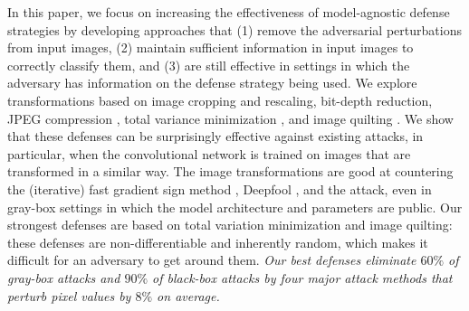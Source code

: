 In this paper, we focus on increasing the effectiveness of model-agnostic defense strategies by developing approaches that (1) remove the adversarial perturbations from input images, (2) maintain sufficient information in input images to correctly classify them, and (3) are still effective in settings in which the adversary has information on the defense strategy being used. We explore transformations based on image cropping and rescaling, bit-depth reduction, JPEG compression \citep{dziugaite2016study}, total variance minimization \citep{rudin1992tvm}, and image quilting \citep{efros2001quilting}. We show that these defenses can be surprisingly effective against existing attacks, in particular, when the convolutional network is trained on images that are transformed in a similar way. The image transformations are good at countering the (iterative) fast gradient sign method \citep{kurakin2016adversarial}, Deepfool \citep{dezfooli2016deepfool}, and the \citet{carlini2017towards} attack, even in gray-box settings in which the model architecture and parameters are public. Our strongest defenses are based on total variation minimization and image quilting: these defenses are non-differentiable and inherently random, which makes it difficult for an adversary to get around them. \emph{Our best defenses eliminate $60\%$ of gray-box attacks and $90\%$ of black-box attacks by four major attack methods that perturb pixel values by $8\%$ on average.}




